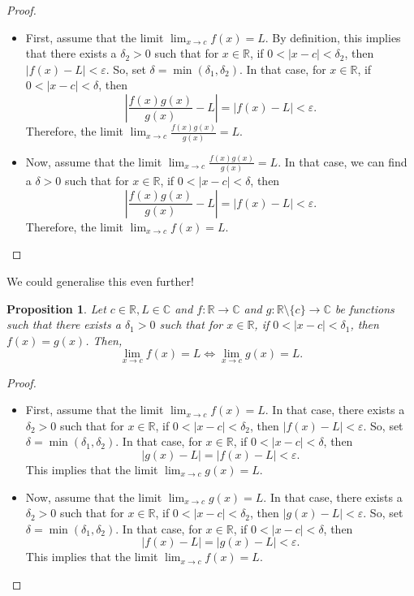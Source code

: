 \documentclass[a4paper, openany]{memoir}
\theoremstyle{definition}
\theoremstyle{plain}
\newtheorem{proposition}[definition]{Proposition}
\begin{document}
\begin{proof}
\hspace*{0pt}
\begin{itemize}
    \item First, assume that the limit $\lim_{x \to c} f(x) = L$. By definition, this implies that there exists a $\delta_2 > 0$ such that for $x \in \mathbb{R}$, if $0 < |x - c| < \delta_2$, then $|f(x) - L| < \varepsilon$. So, set $\delta = \min(\delta_1, \delta_2)$. In that case, for $x \in \mathbb{R}$, if $0 < |x - c| < \delta$, then
    \[\left|\frac{f(x) g(x)}{g(x)} - L\right| = \left|f(x) - L\right| < \varepsilon.\]
    Therefore, the limit $\lim_{x \to c} \frac{f(x) g(x)}{g(x)} = L$.
    
    \item Now, assume that the limit $\lim_{x \to c} \frac{f(x) g(x)}{g(x)} = L$. In that case, we can find a $\delta > 0$ such that for $x \in \mathbb{R}$, if $0 < |x - c| < \delta$, then
    \[\left|\frac{f(x) g(x)}{g(x)} - L\right| = |f(x) - L| < \varepsilon.\]
    Therefore, the limit $\lim_{x \to c} f(x) = L$.
\end{itemize}
\end{proof}
\noindent We could generalise this even further!
\begin{proposition}
Let $c \in \mathbb{R}, L \in \mathbb{C}$ and $f: \mathbb{R} \to \mathbb{C}$ and $g: \mathbb{R} \setminus \{c\} \to \mathbb{C}$ be functions such that there exists a $\delta_1 > 0$ such that for $x \in \mathbb{R}$, if $0 < |x - c| < \delta_1$, then $f(x) = g(x)$. Then,
\[\lim_{x \to c} f(x) = L \iff \lim_{x \to c} g(x) = L.\]
\end{proposition}
\begin{proof}
\hspace*{0pt}
\begin{itemize}
    \item First, assume that the limit $\lim_{x \to c} f(x) = L$. In that case, there exists a $\delta_2 > 0$ such that for $x \in \mathbb{R}$, if $0 < |x - c| < \delta_2$, then $|f(x) - L| < \varepsilon$. So, set $\delta = \min(\delta_1, \delta_2)$. In that case, for $x \in \mathbb{R}$, if $0 < |x - c| < \delta$, then
    \[|g(x) - L| = |f(x) - L| < \varepsilon.\]
    This implies that the limit $\lim_{x \to c} g(x) = L$.
    
    \item Now, assume that the limit $\lim_{x \to c} g(x) = L$. In that case, there exists a $\delta_2 > 0$ such that for $x \in \mathbb{R}$, if $0 < |x - c| < \delta_2$, then $|g(x) - L| < \varepsilon$. So, set $\delta = \min(\delta_1, \delta_2)$. In that case, for $x \in \mathbb{R}$, if $0 < |x - c| < \delta$, then
    \[|f(x) - L| = |g(x) - L| < \varepsilon.\]
    This implies that the limit $\lim_{x \to c} f(x) = L$.
\end{itemize}
\end{proof}
\end{document}
